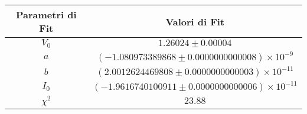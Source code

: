 \begin{tabular}{cc}
\hline
	Parametri di Fit & Valori di Fit\\ 
\hline
	$V_0$ & $1.26024\pm0.00004$ \\
	$a$ & $(-1.080973389868\pm0.0000000000008)\times 10^{-9}$ \\
	$b$ & $(2.0012624469808\pm0.0000000000003)\times 10^{-11}$ \\
	$I_0$ & $(-1.9616740100911\pm0.0000000000006)\times 10^{-11}$ \\
	$\chi^2$ & $23.88$ \\
\hline
\end{tabular}
